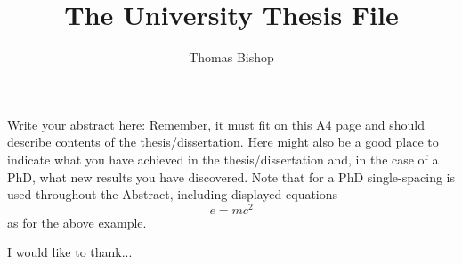 \documentclass[12pt,MSc,twoside]{muthesis}
\numberwithin{equation}{chapter}															%
\begin{document}
\title{The University Thesis File}
\author{Thomas Bishop}
\def\wordcount{nnnnn}




\beforeabstract

Write your abstract here: Remember, it must fit on this A4 page and should
describe contents of the thesis/dissertation. Here might also be a good place
to indicate what you have achieved in the thesis/dissertation and, in the
case of a PhD, what new results you have discovered. Note that for a PhD
single-spacing is used throughout the Abstract, including displayed equations
\[
e = mc^{2}
\]
as for the above example.

\afterabstract

I would like to thank...

\afterpreface

\raggedright          																					%


 





\end{document}
